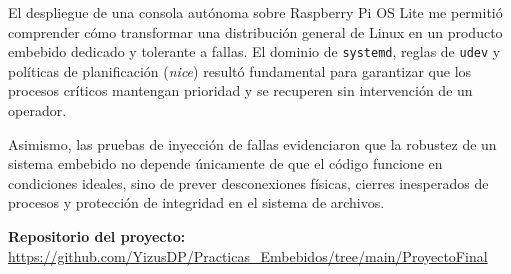 \documentclass[conference]{IEEEtran}
\begin{document}
El despliegue de una consola autónoma sobre Raspberry Pi OS Lite me permitió comprender cómo transformar una distribución general de Linux en un producto embebido dedicado y tolerante a fallas. El dominio de \texttt{systemd}, reglas de \texttt{udev} y políticas de planificación (\textit{nice}) resultó fundamental para garantizar que los procesos críticos mantengan prioridad y se recuperen sin intervención de un operador.

Asimismo, las pruebas de inyección de fallas evidenciaron que la robustez de un sistema embebido no depende únicamente de que el código funcione en condiciones ideales, sino de prever desconexiones físicas, cierres inesperados de procesos y protección de integridad en el sistema de archivos.

\vspace{0.3cm}
\noindent\textbf{Repositorio del proyecto:} \\
\url{https://github.com/YizusDP/Practicas_Embebidos/tree/main/ProyectoFinal}
\end{document}
